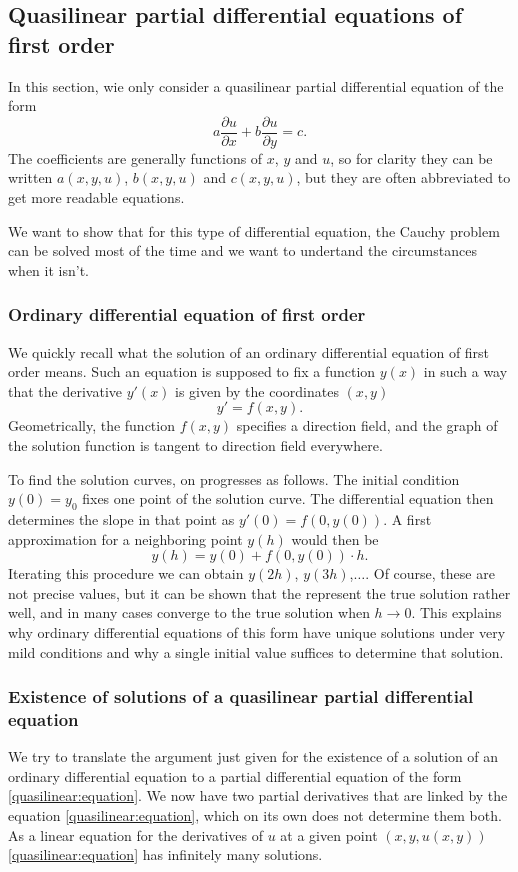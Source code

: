 \subsection{Quasilinear partial differential equations of first order}
In this section, wie only consider a quasilinear partial differential
equation of the form
\begin{equation}
a\frac{\partial u}{\partial x}
+
b\frac{\partial u}{\partial y}
=
c.
\label{quasilinear:equation}
\end{equation}
The coefficients are generally functions of $x$, $y$ and $u$,
so for clarity they can be written $a(x,y,u)$, $b(x,y,u)$ and $c(x,y,u)$,
but they are often abbreviated to get more readable equations.

We want to show that for this type of differential equation, the
Cauchy problem can be solved most of the time and we want to undertand
the circumstances when it isn't.

\subsubsection{Ordinary differential equation of first order}
We quickly recall what the solution of an ordinary differential equation
of first order means.
Such an equation is supposed to fix a function $y(x)$ in such a way
that the derivative $y'(x)$ is given by the coordinates $(x,y)$
\[
y'=f(x,y).
\]
Geometrically, the function $f(x,y)$ specifies a direction field,
and the graph of the solution function is tangent to direction
field everywhere.

To find the solution curves, on progresses as follows.
The initial condition $y(0)=y_0$ fixes one point of the solution
curve.
The differential equation then determines the slope in that point
as $y'(0)=f(0,y(0))$.
A first approximation for a neighboring point $y(h)$ would then be
\begin{equation}
y(h)=y(0)+f(0,y(0))\cdot h.
\label{quasilinear:euler}
\end{equation}
Iterating this procedure we can obtain $y(2h)$, $y(3h)$,$\dots$.
Of course, these are not precise values, but it can be shown that
the represent the true solution rather well, and in many cases
converge to the true solution when $h\to 0$.
This explains why ordinary differential equations of this form have
unique solutions under very mild conditions and why a single
initial value suffices to determine that solution.

\subsubsection{Existence of solutions of a quasilinear partial differential equation}
We try to translate the argument just given for the existence of a solution
of an ordinary differential equation to a partial differential equation of
the form \eqref{quasilinear:equation}.
We now have two partial derivatives that are linked by the equation
\eqref{quasilinear:equation}, which on its own does not determine
them both.
As a linear equation for the derivatives of $u$ at a given point
$(x,y,u(x,y))$
\eqref{quasilinear:equation} has infinitely many solutions.

